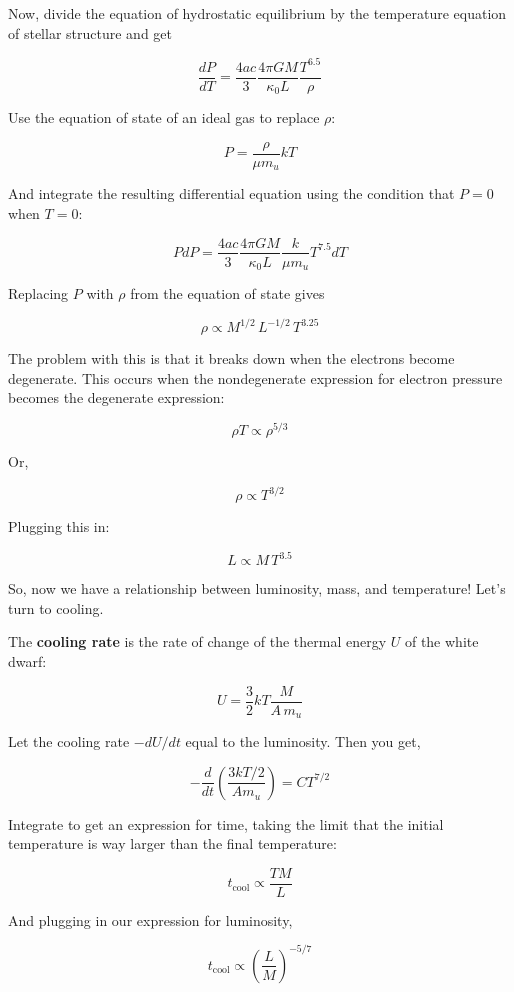 \documentclass[a4paper]{article}
\begin{document}
\begin{enumerate}
Now, divide the equation of hydrostatic equilibrium by the temperature equation of stellar structure and get

$$ \frac{dP}{dT} = \frac{4ac}{3} \frac{4 \pi G M}{\kappa_0 L} \frac{T^{6.5}}{\rho} $$

Use the equation of state of an ideal gas to replace $\rho$:

\begin{equation}
P = \frac{\rho}{\mu m_u} kT
\end{equation}

And integrate the resulting differential equation using the condition that $P = 0$ when $T = 0$:

$$ P dP = \frac{4ac}{3} \frac{4 \pi G M}{\kappa_0 L} \frac{k}{\mu m_u} T^{7.5} dT $$

\noindent Replacing $P$ with $\rho$ from the equation of state gives

$$ \rho \propto M^{1/2} \, L^{-1/2} \, T^{3.25} $$

The problem with this is that it breaks down when the electrons become degenerate. This occurs when the nondegenerate expression for electron pressure becomes the degenerate expression:

$$ \rho T \propto \rho^{5/3} $$

Or,

$$ \rho \propto T^{3/2} $$

Plugging this in:

$$ L \propto M \, T^{3.5} $$

So, now we have a relationship between luminosity, mass, and temperature! Let's turn to cooling.

The \textbf{cooling rate} is the rate of change of the thermal energy $U$ of the white dwarf:

\begin{equation}
U = \frac{3}{2} kT \frac{M}{A \, m_u}
\end{equation}

Let the cooling rate $-dU/dt$ equal to the luminosity. Then you get,

$$ -\frac{d}{dt} \left( \frac{3kT/2}{A m_u} \right) = CT^{7/2}$$

Integrate to get an expression for time, taking the limit that the initial temperature is way larger than the final temperature:

$$ t_{\mathrm{cool}} \propto \frac{TM}{L} $$

And plugging in our expression for luminosity,

$$ t_{\mathrm{cool}} \propto \left( \frac{L}{M} \right)^{-5/7}$$


\end{enumerate}
\end{document}
